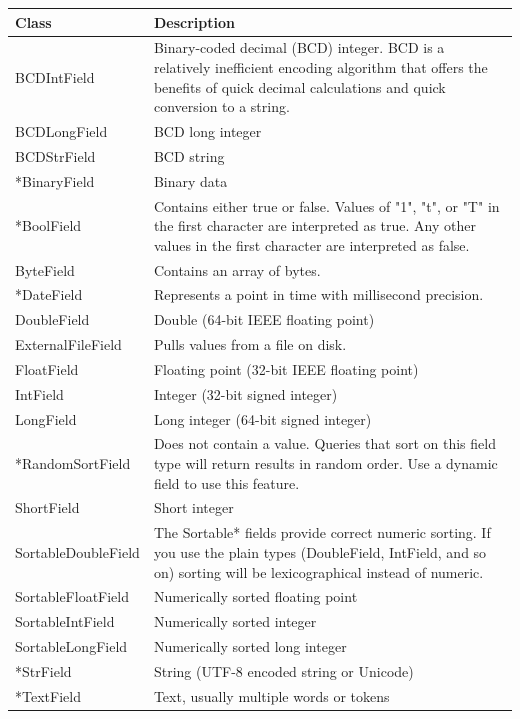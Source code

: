 \begin{longtable}{| p{4cm} | p{11cm} |}
    \hline
    Class & Description \\ \hline
    BCDIntField & Binary-coded decimal (BCD) integer. BCD is a relatively inefficient 
    encoding algorithm that offers the benefits of quick decimal calculations and quick conversion to a string. \\ \hline
    BCDLongField & BCD long integer \\ \hline
    BCDStrField & BCD string \\ \hline
    *BinaryField & Binary data \\ \hline
    *BoolField & Contains either true or false. Values of "1", "t", or "T" in the first character are interpreted as true. Any other values in the first character are interpreted as false. \\ \hline
    ByteField & Contains an array of bytes. \\ \hline
    *DateField & Represents a point in time with millisecond precision. \\ \hline
    DoubleField & Double (64-bit IEEE floating point) \\ \hline
    ExternalFileField & Pulls values from a file on disk. \\ \hline
    FloatField & Floating point (32-bit IEEE floating point) \\ \hline
    IntField & Integer (32-bit signed integer) \\ \hline
    LongField & Long integer (64-bit signed integer) \\ \hline
    *RandomSortField & Does not contain a value. Queries that sort on this field type will return results in random order. Use a dynamic field to use this feature. \\ \hline
    ShortField & Short integer \\ \hline
    SortableDoubleField & The Sortable* fields provide correct numeric sorting. If you use the plain types (DoubleField, IntField, and so on) sorting will be lexicographical instead of numeric. \\ \hline
    SortableFloatField & Numerically sorted floating point \\ \hline
    SortableIntField & Numerically sorted integer \\ \hline
    SortableLongField & Numerically sorted long integer \\ \hline
    *StrField & String (UTF-8 encoded string or Unicode) \\ \hline
    *TextField & Text, usually multiple words or tokens \\ \hline

\end{longtable}
